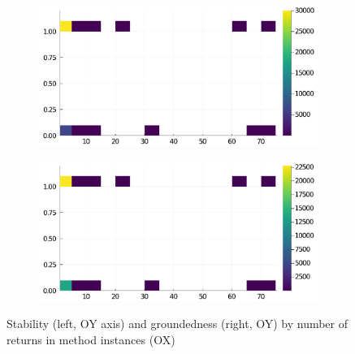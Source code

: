 \begin{figure}[h]
     \begin{subfigure}[b]{0.49\textwidth}
       \includegraphics[width=\textwidth]{figs/all-package-graphs/JuMP-returns-vs-stable.pdf}
     \end{subfigure}
     \begin{subfigure}[b]{0.49\textwidth}
       \includegraphics[width=\textwidth]{figs/all-package-graphs/JuMP-returns-vs-grounded.pdf}
     \end{subfigure}
\caption{Stability (left, OY axis) and groundedness (right, OY) by number of returns in method instances (OX)}%
%
\label{figs:returns:JuMP}
\end{figure}
\clearpage
